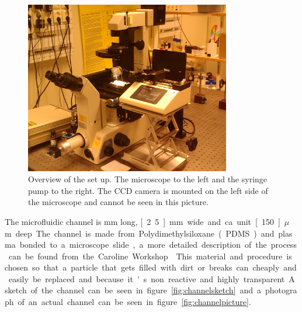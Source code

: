\begin{figure}[H]
\centering
\includegraphics[width=0.8\textwidth]{figures/method/ExperimentalOverview.jpg}
\caption{Overview of the set up. The microscope to the left and the syringe pump to the right. The CCD camera is mounted on the left side of the microscope and cannot be seen in this picture.}\label{fig:setuppicture}
\end{figure}


The microfluidic channel is \unit[40]{mm} long, \unit[2.5]{mm} wide and ca unit[150]{$\mu$m} deep. The channel is made from Polydimethylsiloxane (PDMS) and plasma bonded to a microscope slide, a more detailed description of the process can be found from the Caroline Workshop \cite{PDMS}. This material and procedure is chosen so that a particle that gets filled with dirt or breaks can cheaply and easily be replaced and because it's non reactive and highly transparent. A sketch of the channel can be seen in figure \ref{fig:channelsketch} and a photograph of an actual channel can be seen in figure \ref{fig:channelpicture}. 

